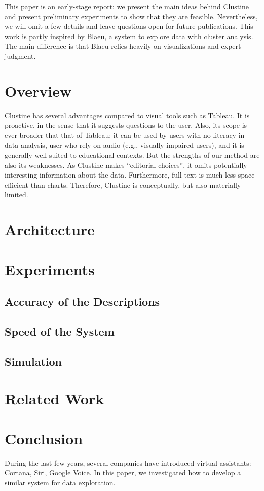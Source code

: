 This paper is an early-stage report: we present the main ideas behind Clustine
and present preliminary experiments to show that they are feasible.
Nevertheless, we will omit a few details and leave questions open for future
publications. This work is partly inspired by Blaeu, a system to explore data
with cluster analysis. The main difference is that Blaeu relies heavily on
visualizations and expert judgment.

\section{Overview}
\label{sec:overview}

Clustine has several advantages compared to visual tools such as Tableau. It is
proactive, in the sense that it suggests questions to the user. Also, its scope
is ever broader that that of Tableau: it can be used by users with no literacy
in data analysis, user who rely on audio (e.g., visually impaired users), and
it is generally well suited to educational contexts. But the strengths of our
method are also its weaknesses. As Clustine makes ``editorial choices'', it
omits potentially interesting information about the data. Furthermore, full
text is much less space efficient than charts. Therefore, Clustine is
conceptually, but also materially limited.

\section{Architecture}
\label{sec:architecture}

\section{Experiments}
\label{sec:experiments}

\subsection{Accuracy of the Descriptions}
\label{sec:description}

\subsection{Speed of the System}
\label{sec:speed}

\subsection{Simulation}
\label{sec:simulation}

\section{Related Work}
\label{sec:related}

\section{Conclusion}
\label{sec:conclusion}
During the last few years, several companies have introduced virtual
assistants: Cortana, Siri, Google Voice. In this paper, we investigated how to
develop a similar system for data exploration.

